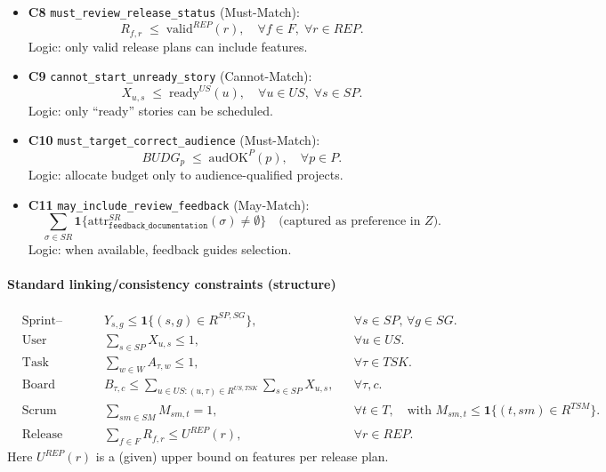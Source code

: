 \documentclass[11pt,a4paper]{article}
\begin{document}
\begin{itemize}[leftmargin=2em]
  \item \textbf{C8} \texttt{must\_review\_release\_status} (Must-Match):
  \[
  R_{f,r} \;\le\; \mathrm{valid}^{REP}(r),\quad \forall f\in F,\;\forall r\in REP.
  \]
  Logic: only valid release plans can include features.

  \item \textbf{C9} \texttt{cannot\_start\_unready\_story} (Cannot-Match):
  \[
  X_{u,s} \;\le\; \mathrm{ready}^{US}(u),\quad \forall u\in US,\;\forall s\in SP.
  \]
  Logic: only “ready” stories can be scheduled.

  \item \textbf{C10} \texttt{must\_target\_correct\_audience} (Must-Match):
  \[
  BUDG_p \;\le\; \mathrm{audOK}^{P}(p),\quad \forall p\in P.
  \]
  Logic: allocate budget only to audience-qualified projects.

  \item \textbf{C11} \texttt{may\_include\_review\_feedback} (May-Match):
  \[
  \sum_{\sigma\in SR} \mathbf{1}\{\mathrm{attr}^{SR}_{\texttt{feedback\_documentation}}(\sigma)\neq \emptyset\}
  \quad\text{(captured as preference in $Z$)}.
  \]
  Logic: when available, feedback guides selection.
\end{itemize}

\paragraph{Standard linking/consistency constraints (structure)}
\begin{align*}
  &\text{Sprint--Goal activation:} &
  &Y_{s,g} \le \mathbf{1}\{(s,g)\in R^{SP,SG}\}, && \forall s\in SP,\,\forall g\in SG.\\
  &\text{User story--sprint uniqueness:} &
  &\sum_{s\in SP} X_{u,s} \le 1, && \forall u\in US.\\
  &\text{Task assignment uniqueness (optional):} &
  &\sum_{w\in W} A_{\tau,w} \le 1, && \forall \tau\in TSK.\\
  &\text{Board visibility only for sprint tasks:} &
  &B_{\tau,c} \le \sum_{u\in US:(u,\tau)\in R^{US,TSK}}\sum_{s\in SP} X_{u,s}, && \forall \tau,c.\\
  &\text{Scrum Master support:} &
  &\sum_{sm\in SM} M_{sm,t} = 1, && \forall t\in T, \quad \text{with } M_{sm,t}\le \mathbf{1}\{(t,sm)\in R^{TSM}\}.\\
  &\text{Release plan feature count (example cap):} &
  &\sum_{f\in F} R_{f,r} \le U^{REP}(r), && \forall r\in REP.
\end{align*}
Here $U^{REP}(r)$ is a (given) upper bound on features per release plan.
\end{document}
